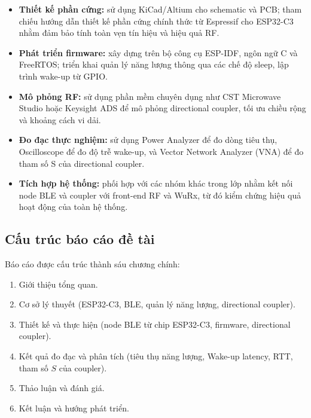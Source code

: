\begin{itemize}[label=-]
	\item \textbf{Thiết kế phần cứng:} sử dụng KiCad/Altium cho schematic và PCB; tham chiếu hướng dẫn thiết kế phần cứng chính thức từ Espressif cho ESP32-C3 nhằm đảm bảo tính toàn vẹn tín hiệu và hiệu quả RF.
	\item \textbf{Phát triển firmware:} xây dựng trên bộ công cụ ESP-IDF, ngôn ngữ C và FreeRTOS; triển khai quản lý năng lượng thông qua các chế độ sleep, lập trình wake-up từ GPIO.
	\item \textbf{Mô phỏng RF:} sử dụng phần mềm chuyên dụng như CST Microwave Studio hoặc Keysight ADS để mô phỏng directional coupler, tối ưu chiều rộng và khoảng cách vi dải.
	\item \textbf{Đo đạc thực nghiệm:} sử dụng Power Analyzer để đo dòng tiêu thụ, Oscilloscope để đo độ trễ wake-up, và Vector Network Analyzer (VNA) để đo tham số S của directional coupler.
	\item \textbf{Tích hợp hệ thống:} phối hợp với các nhóm khác trong lớp nhằm kết nối node BLE và coupler với front-end RF và WuRx, từ đó kiểm chứng hiệu quả hoạt động của toàn hệ thống.
\end{itemize}

\subsection{Cấu trúc báo cáo đề tài}

\noindent Báo cáo được cấu trúc thành sáu chương chính:

\begin{enumerate}[label=Chương \arabic*:, leftmargin=2.5cm]
	\item Giới thiệu tổng quan.
	\item Cơ sở lý thuyết (ESP32-C3, BLE, quản lý năng lượng, directional coupler).
	\item Thiết kế và thực hiện (node BLE từ chip ESP32-C3, firmware, directional coupler).
	\item Kết quả đo đạc và phân tích (tiêu thụ năng lượng, Wake-up latency, RTT, tham số $ S $ của coupler).
	\item Thảo luận và đánh giá.
	\item Kết luận và hướng phát triển.
\end{enumerate}

